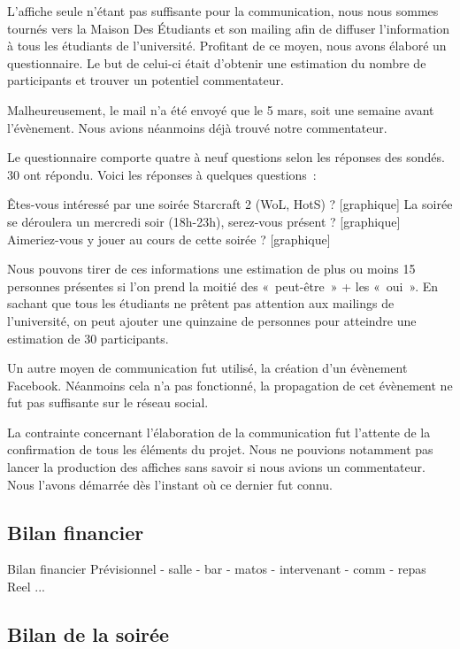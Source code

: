 L’affiche seule n’étant pas suffisante pour la communication, nous nous sommes tournés vers la
Maison Des Étudiants et son mailing afin de diffuser l’information à tous les étudiants de l’université.
Profitant de ce moyen, nous avons élaboré un questionnaire. Le but de celui-ci était d’obtenir une estimation
du nombre de participants et trouver un potentiel commentateur.

Malheureusement, le mail n’a été envoyé que le 5 mars, soit une semaine avant l’évènement.
Nous avions néanmoins déjà trouvé notre commentateur.

Le questionnaire comporte quatre à neuf questions selon les réponses des sondés. 30 ont répondu.
Voici les réponses à quelques questions :


Êtes-vous intéressé par une soirée Starcraft 2 (WoL, HotS) ?
[graphique]
La soirée se déroulera un mercredi soir (18h-23h), serez-vous présent ?
[graphique]
Aimeriez-vous y jouer au cours de cette soirée ?
[graphique]

Nous pouvons tirer de ces informations une estimation de plus ou moins 15 personnes présentes si l’on prend
la moitié des « peut-être » + les « oui ».
En sachant que tous les étudiants ne prêtent pas attention aux mailings de l’université, on peut ajouter
une quinzaine de personnes pour atteindre une estimation de 30 participants.

Un autre moyen de communication fut utilisé, la création d'un évènement Facebook. Néanmoins cela n'a pas fonctionné,
la propagation de cet évènement ne fut pas suffisante sur le réseau social.

La contrainte concernant l’élaboration de la communication fut  l’attente de la confirmation de tous les éléments du projet.
Nous ne pouvions notamment pas lancer la production des affiches sans savoir si nous avions un commentateur. Nous l’avons démarrée
dès l’instant où ce dernier fut connu.

\subsection{Bilan financier}%
\label{sub:bilan_financier}

Bilan financier
        Prévisionnel
            - salle
            - bar
            - matos
            - intervenant
            - comm
            - repas
        Reel
           ...

\subsection{Bilan de la soirée}%
\label{sub:Bilan_de_la_soiree}

